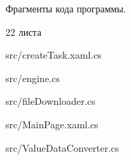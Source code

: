 \begin{center}
	Фрагменты кода программы.
\end{center}
\begin{center}
	22 листа
\end{center}
\newpage


%

%

%




{src/createTask.xaml.cs}

%


{src/engine.cs}


{src/fileDownloader.cs}

{src/MainPage.xaml.cs}

%

%

%

%


{src/ValueDataConverter.cs}

%

%

